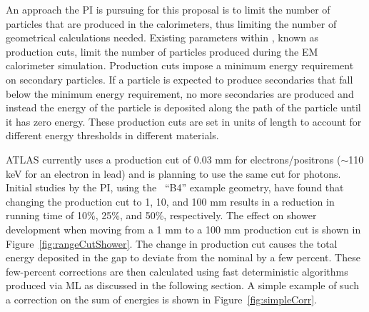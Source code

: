 \documentclass[letter, USenglish, 11pt, subfigure]{article}
\begin{document}
An approach the PI is pursuing for this proposal is to limit the number of particles that are produced in the calorimeters, thus limiting the number of geometrical calculations needed. Existing parameters within \GEANT, known as production cuts, limit the number of particles produced during the EM calorimeter simulation. Production cuts impose a minimum energy requirement on secondary particles. If a particle is expected to produce secondaries that fall below the minimum energy requirement, no more secondaries are produced and instead the energy of the particle is deposited along the path of the particle until it has zero energy. These production cuts are set in units of length to account for different energy thresholds in different materials. 

ATLAS currently uses a production cut of 0.03 mm for electrons/positrons ($\sim$110 keV for an electron in lead) and is planning to use the same cut for photons. Initial studies by the PI, using the \GEANT\ ``B4'' example geometry, have found that changing the production cut to 1, 10, and 100 mm results in a reduction in running time of 10\%, 25\%, and 50\%, respectively. The effect on shower development when moving from a 1 mm to a 100 mm production cut is shown in Figure~\ref{fig:rangeCutShower}. The change in production cut causes the total energy deposited in the gap to deviate from the nominal by a few percent. These few-percent corrections are then calculated using fast deterministic algorithms produced via ML as discussed in the following section. A simple example of such a correction on the sum of energies is shown in Figure~\ref{fig:simpleCorr}.
\end{document}
